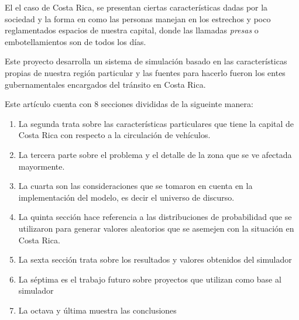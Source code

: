 \documentclass[conference]{IEEEtran}
\begin{document}
El el caso de Costa Rica, se presentan ciertas caracter\'isticas dadas por la sociedad y la forma en como las personas manejan en los estrechos y poco reglamentados espacios de nuestra capital, donde las llamadas \textit{presas} o embotellamientos son de todos los d\'ias.

Este proyecto desarrolla un sistema de simulaci\'on basado en las caracter\'isticas propias de nuestra regi\'on particular y las fuentes para hacerlo fueron los entes gubernamentales encargados del tr\'ansito en Costa Rica.

Este art\'iculo cuenta con 8 secciones divididas de la sigueinte manera:
\begin{enumerate}
\item La segunda trata sobre las caracter\'isticas particulares que tiene la capital de Costa Rica con respecto a la circulaci\'on de veh\'iculos. 
\item La tercera parte sobre el problema y el detalle de la zona que se ve afectada mayormente. 
\item La cuarta son las consideraciones que se tomaron en cuenta en la implementaci\'on del modelo, es decir el universo de discurso. 
\item La quinta secci\'on hace referencia a las distribuciones de probabilidad que se utilizaron para generar valores aleatorios que se asemejen con la situaci\'on en Costa Rica.
\item La sexta sección trata sobre los resultados y  valores obtenidos del simulador
\item La s\'eptima es el trabajo futuro sobre proyectos que utilizan como base al simulador
\item La octava y \'ultima muestra las conclusiones

\end{enumerate}
\end{document}
